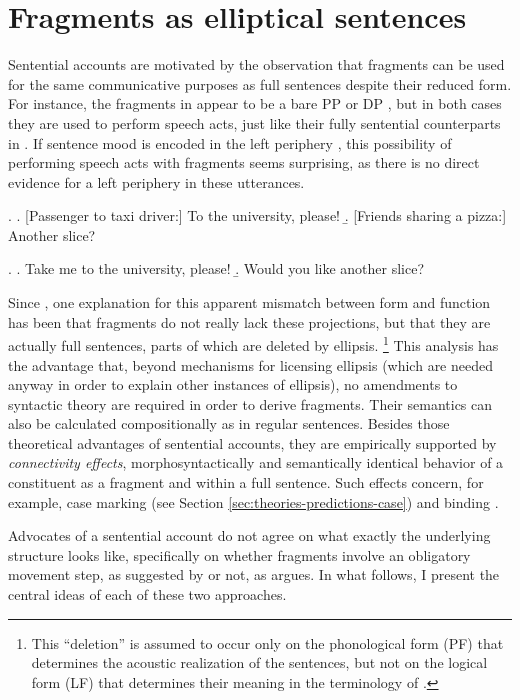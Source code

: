 \section{Fragments as elliptical sentences}
\label{sec:theories-sentential}

Sentential accounts are motivated by the observation that fragments can be used for the same communicative purposes as full sentences despite their reduced form. For instance, the fragments in \Next appear to be a bare PP \Next[a] or DP \Next[b], but in both cases they are used to perform speech acts, just like their fully sentential counterparts in \NNext. If sentence mood is encoded in the left periphery \citep[see e.g.][]{rizzi1997}, this possibility of performing speech acts with fragments seems surprising, as there is no direct evidence for a left periphery in these utterances.

\ex. \a. [Passenger to taxi driver:] To the university, please!
    \b.  [Friends sharing a pizza:] Another slice?
    
\ex. \a. Take me to the university, please!
     \b. Would you like another slice?

Since \citet{morgan1973}, one explanation for this apparent mismatch between form and function has been that fragments do not really lack these projections, but that they are actually full sentences, parts of which are deleted by ellipsis.%
%
\footnote{This ``deletion'' is assumed to occur only on the phonological form (PF) that determines the acoustic realization of the sentences, but not on the logical form (LF) that determines their meaning in the terminology of \citet{chomsky1981}.}\afterfn%
%
This analysis has the advantage that, beyond mechanisms for licensing ellipsis (which are needed anyway in order to explain other instances of ellipsis), no amendments to syntactic theory are required in order to derive fragments. Their semantics can also be calculated compositionally as in regular sentences. Besides those theoretical advantages of sentential accounts, they are empirically supported by \textit{connectivity effects}, morphosyntactically and semantically identical behavior of a constituent as a fragment and within a full sentence. Such effects concern, for example, case marking (see Section \ref{sec:theories-predictions-case}) and binding \citep{merchant2004}.

Advocates of a sentential account do not agree on what exactly the underlying structure looks like, specifically on whether fragments involve an obligatory movement step, as suggested by \citet{merchant2004} or not, as \citet{reich2007} argues. In what follows, I present the central ideas of each of these two approaches.

